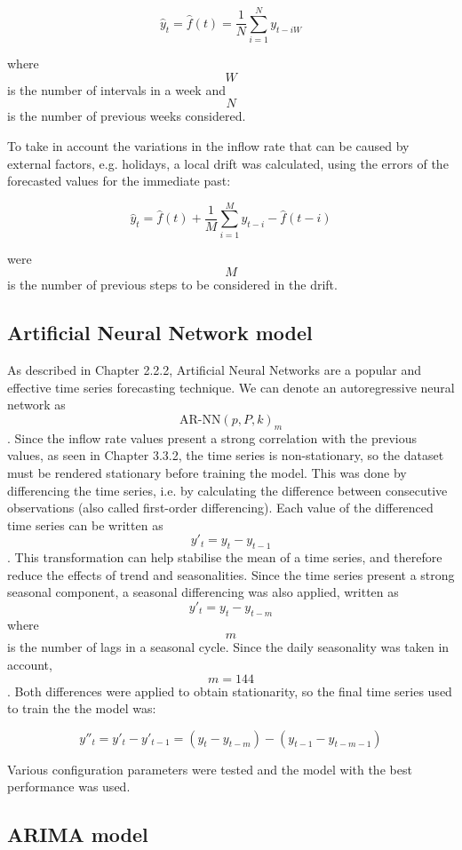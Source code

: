 $$ \hat{y}_t = \hat{f}(t) = \frac{1}{N} \sum_{i=1}^{N} y_{t-iW} $$

where $$ W $$ is the number of intervals in a week and $$ N $$ is the number of previous weeks considered.

To take in account the variations in the inflow rate that can be caused by external factors, e.g. holidays, a local drift was calculated, using the errors of the forecasted values for the immediate past:

$$ \hat{y}_t = \hat{f}(t) + \frac{1}{M} \sum_{i=1}^{M} y_{t-i} - \hat{f}(t-i) $$

were $$ M $$is the number of previous steps to be considered in the drift.


\subsection{Artificial Neural Network model}
\label{subsec:ann_model}
As described in Chapter 2.2.2, Artificial Neural Networks are a popular and effective time series forecasting technique. We can denote an autoregressive neural network as $$ \text{AR-NN}(p, P, k)_m $$.
Since the inflow rate values present a strong correlation with the previous values, as seen in Chapter 3.3.2, the time series is non-stationary, so the dataset must be rendered stationary before training the model. This was done by differencing the time series, i.e. by calculating the difference between consecutive observations (also called first-order differencing). Each value of the differenced time series can be written as $$ y'_t = y_t - y_{t-1} $$. This transformation can help stabilise the mean of a time series, and therefore reduce the effects of trend and seasonalities. Since the time series present a strong seasonal component, a seasonal differencing was also applied, written as $$ y'_t = y_t - y_{t-m} $$ where $$ m $$ is the number of lags in a seasonal cycle. Since the daily seasonality was taken in account, $$ m = 144 $$. Both differences were applied to obtain stationarity, so the final time series used to train the the model was:

$$ y''_t = y'_t - y'_{t-1} = (y_t - y_{t-m}) - (y_{t-1} - y_{t-m-1}) $$

Various configuration parameters were tested and the model with the best performance was used.

\subsection{ARIMA model}
\label{subsec:arima_model}

